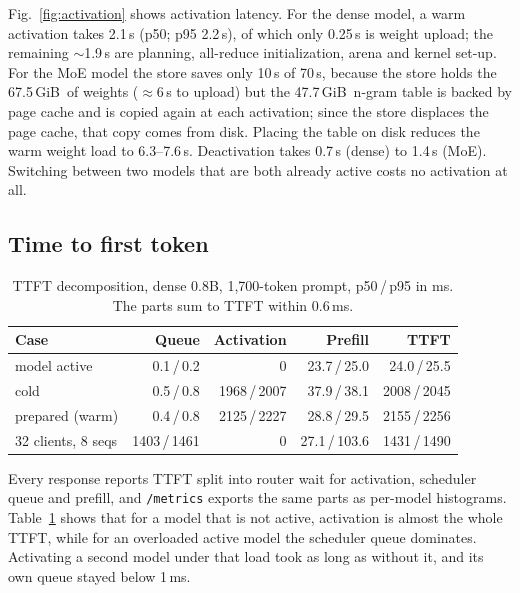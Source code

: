 \documentclass[10pt,conference,a4paper]{IEEEtran}
\newcommand{\code}[1]{\texttt{#1}}
\newcommand{\GiB}{\,GiB}
\begin{document}
Fig.~\ref{fig:activation} shows activation latency. For the dense model, a warm activation takes
2.1\,s (p50; p95 2.2\,s), of which only 0.25\,s is weight upload; the remaining $\sim$1.9\,s are
planning, all-reduce initialization, arena and kernel set-up. For the MoE model the store saves only
10\,s of 70\,s, because the store holds the 67.5\GiB\ of weights ($\approx$6\,s to upload) but the
47.7\GiB\ n-gram table is backed by page cache and is copied again at each activation; since the
store displaces the page cache, that copy comes from disk. Placing the table on disk reduces the warm
weight load to 6.3--7.6\,s. Deactivation takes 0.7\,s (dense) to 1.4\,s (MoE). Switching between two
models that are both already active costs no activation at all.

\subsection{Time to first token}

\begin{table}[t]
\caption{TTFT decomposition, dense 0.8B, 1{,}700-token prompt, p50\,/\,p95 in ms. The parts sum to TTFT within 0.6\,ms.}
\label{tab:ttft}
\centering\footnotesize
\setlength{\tabcolsep}{3.2pt}
\begin{tabular}{@{}lrrrr@{}}
\toprule
Case & Queue & Activation & Prefill & TTFT \\
\midrule
model active        & 0.1\,/\,0.2   & 0              & 23.7\,/\,25.0  & 24.0\,/\,25.5 \\
cold                & 0.5\,/\,0.8   & 1968\,/\,2007  & 37.9\,/\,38.1  & 2008\,/\,2045 \\
prepared (warm)     & 0.4\,/\,0.8   & 2125\,/\,2227  & 28.8\,/\,29.5  & 2155\,/\,2256 \\
32 clients, 8 seqs  & 1403\,/\,1461 & 0              & 27.1\,/\,103.6 & 1431\,/\,1490 \\
\bottomrule
\end{tabular}
\end{table}

Every response reports TTFT split into router wait for activation, scheduler queue and prefill, and
\code{/metrics} exports the same parts as per-model histograms. Table~\ref{tab:ttft} shows that for a
model that is not active, activation is almost the whole TTFT, while for an overloaded active model
the scheduler queue dominates. Activating a second model under that load took as long as without it,
and its own queue stayed below 1\,ms.
\end{document}
